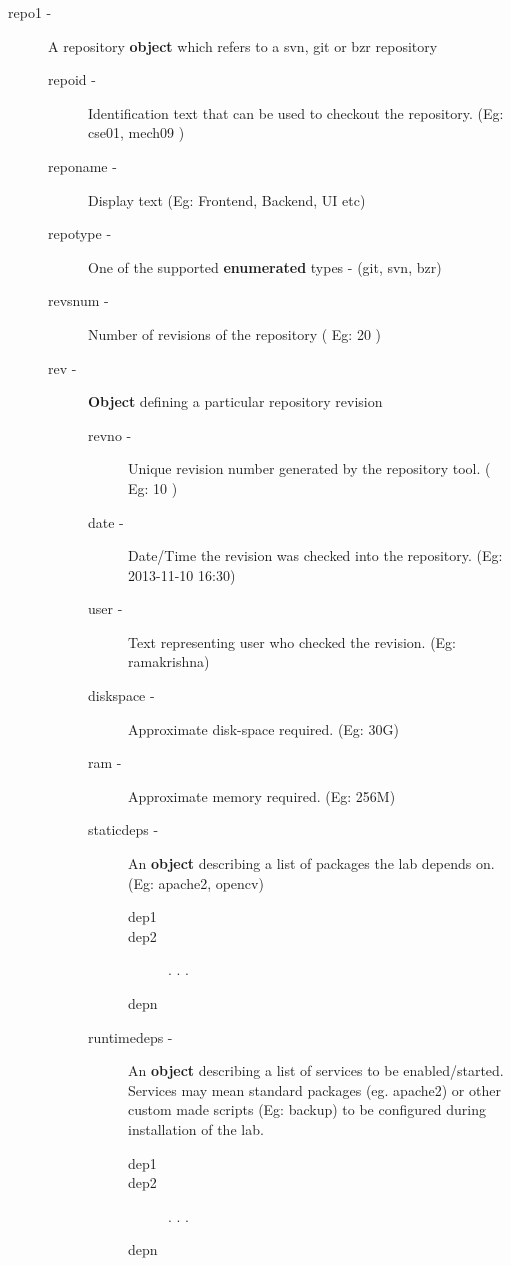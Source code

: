 \documentclass[11pt]{article}
\begin{document}
\begin{description}
\begin{description}
\begin{description}
\item [repo1 -] A repository \textbf{object} which refers to a svn, git or bzr repository

\begin{description}
\item [repoid -] Identification text that can be used to checkout the repository. (Eg: cse01, mech09 )
\item [reponame -] Display text (Eg: Frontend, Backend, UI etc)
\item [repotype -] One of the supported \textbf{enumerated} types - (git, svn, bzr)
\item [revsnum -] Number of revisions of the repository ( Eg: 20 )
\item [rev -] \textbf{Object} defining a particular repository revision

\begin{description}
\item [revno -] Unique revision number generated by the repository tool. ( Eg: 10 )
\item [date -] Date/Time the revision was checked into the repository. (Eg: 2013-11-10 16:30)
\item [user -] Text representing user who checked the revision. (Eg: ramakrishna)
\item [diskspace -] Approximate disk-space required. (Eg: 30G)
\item [ram -] Approximate memory required. (Eg: 256M)
\item [staticdeps -] An \textbf{object} describing a list of packages the lab depends on. (Eg: apache2, opencv)

\begin{description}
\item [dep1]
\item [dep2]
                      .
                      .
                      .
\item [depn]
\end{description}

\item [runtimedeps -] An \textbf{object} describing a list of services to be enabled/started. Services may mean
                                standard packages (eg. apache2) or other custom made scripts (Eg: backup)
                                to be configured during installation of the lab.

\begin{description}
\item [dep1]
\item [dep2]
                      .
                      .
                      .
\item [depn]
\end{description}


\end{description}
\end{description}
\end{description}
\end{description}
\end{description}
\end{document}
